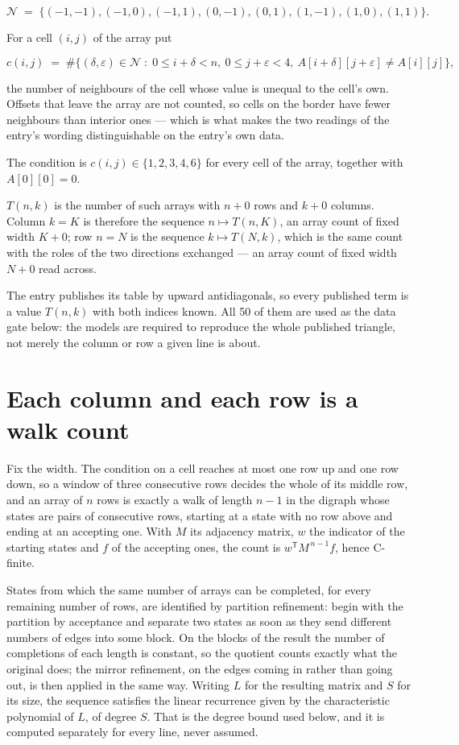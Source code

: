 \documentclass[11pt]{article}
\theoremstyle{definition}
\begin{document}
\[\mathcal{N} \;=\; \{(-1,-1), (-1,0), (-1,1), (0,-1), (0,1), (1,-1), (1,0), (1,1)\}.\]

For a cell $(i,j)$ of the array put

\[c(i,j) \;=\; \#\bigl\{(\delta,\varepsilon)\in\mathcal{N} \;:\; 0\le i+\delta<n,\ 0\le j+\varepsilon<4,\ A[i+\delta][j+\varepsilon] \neq A[i][j]\bigr\},\]

the number of neighbours of the cell whose value is unequal to the cell's own. Offsets that leave the array are not counted, so cells on the border have fewer neighbours than interior ones --- which is what makes the two readings of the entry's wording distinguishable on the entry's own data.

The condition is $c(i,j) \in \{1, 2, 3, 4, 6\}$ for every cell of the array, together with $A[0][0]=0$.

$T(n,k)$ is the number of such arrays with $n + 0$ rows and $k + 0$ columns. Column $k = K$ is therefore the sequence $n \mapsto T(n,K)$, an array count of fixed width $K + 0$; row $n = N$ is the sequence $k \mapsto T(N,k)$, which is the same count with the roles of the two directions exchanged --- an array count of fixed width $N + 0$ read across.

The entry publishes its table by upward antidiagonals, so every published term is a value $T(n,k)$ with both indices known. All 50 of them are used as the data gate below: the models are required to reproduce the whole published triangle, not merely the column or row a given line is about.

\section{Each column and each row is a walk count}

Fix the width. The condition on a cell reaches at most one row up and one row down, so a window of three consecutive rows decides the whole of its middle row, and an array of $n$ rows is exactly a walk of length $n-1$ in the digraph whose states are pairs of consecutive rows, starting at a state with no row above and ending at an accepting one. With $M$ its adjacency matrix, $w$ the indicator of the starting states and $f$ of the accepting ones, the count is $w^{\mathsf T}M^{\,n-1}f$, hence C-finite.

States from which the same number of arrays can be completed, for every remaining number of rows, are identified by partition refinement: begin with the partition by acceptance and separate two states as soon as they send different numbers of edges into some block. On the blocks of the result the number of completions of each length is constant, so the quotient counts exactly what the original does; the mirror refinement, on the edges coming in rather than going out, is then applied in the same way. Writing $L$ for the resulting matrix and $S$ for its size, the sequence satisfies the linear recurrence given by the characteristic polynomial of $L$, of degree $S$. That is the degree bound used below, and it is computed separately for every line, never assumed.
\end{document}
